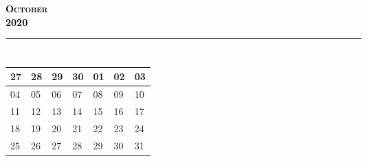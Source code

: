 \documentclass{article}
\newcommand{\daysize}{2.5cm}		%
\newcommand{\dw}{3.5cm}					%
\newcommand{\mkday}[1]{
  #1
  \vspace{\daysize}
}
\begin{document}
		\begin{center}
			\textsc{\LARGE \textbf{\textcolor{black}{
			October
			}}}\\ %
			\textsc{\large \textbf{\textcolor{black}{
			2020
			}}} %
		\end{center}

		\begin{center}
		\begin{tabular}{| p{\dw} | p{\dw} | p{\dw} | p{\dw} | p{\dw} | p{\dw} | p{\dw} |}
			\hline
			\cellcolor{bannercolor} \textcolor{white}{Sunday} &
			\cellcolor{bannercolor} \textcolor{white}{Monday} &
			\cellcolor{bannercolor} \textcolor{white}{Tuesday} &
			\cellcolor{bannercolor} \textcolor{white}{Wednesday} &
			\cellcolor{bannercolor} \textcolor{white}{Thursday} &
			\cellcolor{bannercolor} \textcolor{white}{Friday} &
			\cellcolor{bannercolor} \textcolor{white}{Saturday} \\
			\hline
		\end{tabular}

		\vspace{0.1cm}

		\begin{tabular}{| p{\dw} | p{\dw} | p{\dw} | p{\dw} | p{\dw} | p{\dw} | p{\dw} |}
\hline 
\cellcolor{weekendcolor}\mkday{
    27
} & 
\mkday{
    28
} &
\mkday{
    29
} &
\mkday{
    30
} &
\mkday{
    01
} &
\mkday{
    02
} &
\cellcolor{weekendcolor}\mkday{
    03
} 
\\
\hline 
\cellcolor{weekendcolor}\mkday{
    04
} & 
\mkday{
    05
} &
\mkday{
    06
} &
\mkday{
    07
} &
\mkday{
    08
} &
\mkday{
    09
} &
\cellcolor{weekendcolor}\mkday{
    10
} 
\\
\hline 
\cellcolor{weekendcolor}\mkday{
    11
} & 
\mkday{
    12
} &
\mkday{
    13
} &
\mkday{
    14
} &
\mkday{
    15
} &
\mkday{
    16
} &
\cellcolor{weekendcolor}\mkday{
    17
} 
\\
\hline 
\cellcolor{weekendcolor}\mkday{
    18
} & 
\mkday{
    19
} &
\mkday{
    20
} &
\mkday{
    21
} &
\mkday{
    22
} &
\mkday{
    23
} &
\cellcolor{weekendcolor}\mkday{
    24
} 
\\
\hline 
\cellcolor{weekendcolor}\mkday{
    25
} & 
\mkday{
    26
} &
\mkday{
    27
} &
\mkday{
    28
} &
\mkday{
    29
} &
\mkday{
    30
} &
\cellcolor{weekendcolor}\mkday{
    31
} 
\\
		\end{tabular}

		\end{center}
\end{document}
